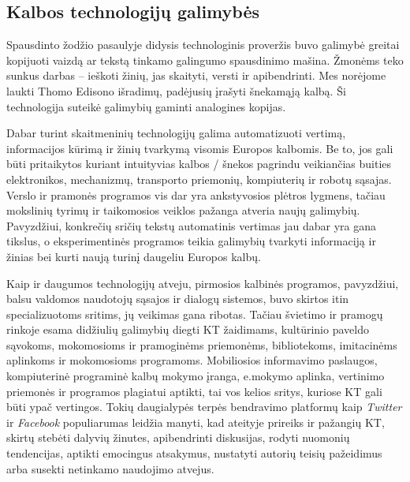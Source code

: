 \documentclass[]{../metanetpaper}
\begin{document}
\begin{multicols}{2}
\subsection{Kalbos technologijų galimybės}

Spausdinto žodžio pasaulyje didysis technologinis proveržis buvo galimybė greitai kopijuoti vaizdą ar tekstą  tinkamo galingumo spausdinimo mašina. Žmonėms teko sunkus darbas – ieškoti žinių, jas skaityti, versti ir apibendrinti. Mes norėjome laukti Thomo Edisono išradimų, padėjusių įrašyti šnekamąją kalbą. Ši technologija suteikė galimybių gaminti analogines kopijas.

Dabar turint skaitmeninių technologijų galima automatizuoti vertimą, informacijos kūrimą ir žinių tvarkymą visomis Europos kalbomis. Be to, jos gali būti pritaikytos kuriant intuityvias kalbos / šnekos pagrindu veikiančias buities elektronikos, mechanizmų, transporto priemonių, kompiuterių ir robotų sąsajas. Verslo ir pramonės programos vis dar yra ankstyvosios plėtros lygmens, tačiau mokslinių tyrimų ir taikomosios veiklos pažanga atveria naujų galimybių. Pavyzdžiui, konkrečių sričių tekstų automatinis vertimas jau dabar yra gana tikslus, o eksperimentinės programos teikia galimybių tvarkyti informaciją ir žinias bei kurti naują turinį daugeliu Europos kalbų. 

 Kaip ir daugumos technologijų atveju, pirmosios kalbinės programos, pavyzdžiui, balsu valdomos naudotojų sąsajos ir dialogų sistemos, buvo skirtos itin specializuotoms sritims, jų veikimas gana ribotas. Tačiau švietimo ir pramogų rinkoje esama didžiulių galimybių diegti KT žaidimams, kultūrinio paveldo sąvokoms, mokomosioms ir pramoginėms priemonėms, bibliotekoms, imitacinėms aplinkoms ir mokomosioms programoms. Mobiliosios informavimo paslaugos, kompiuterinė programinė kalbų mokymo įranga, e.mokymo aplinka, vertinimo priemonės ir programos plagiatui aptikti, tai vos kelios sritys, kuriose KT gali būti ypač vertingos. Tokių daugialypės terpės bendravimo platformų kaip \textit{Twitter} ir \textit{Facebook} populiarumas leidžia manyti, kad ateityje prireiks ir pažangių KT, skirtų stebėti dalyvių žinutes, apibendrinti diskusijas, rodyti nuomonių tendencijas, aptikti emocingus atsakymus, nustatyti autorių teisių pažeidimus arba susekti netinkamo naudojimo atvejus.



\end{multicols}
\end{document}

